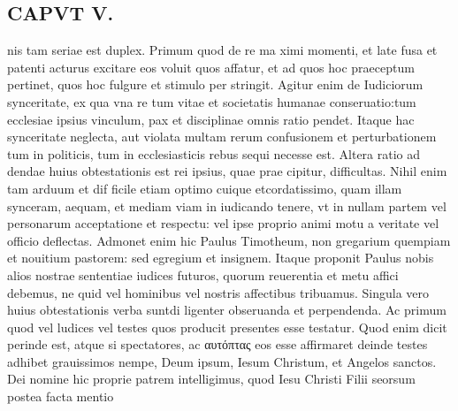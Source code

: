 \documentclass{article}
\begin{document}
\begin{pages}
\section*{CAPVT V. }
\marginpar{[ p.329 ]}\pstart nis tam seriae est duplex. Primum quod de re ma ximi momenti, et late fusa et patenti acturus excitare eos voluit quos affatur, et ad quos hoc praeceptum pertinet, quos hoc fulgure et stimulo per stringit. Agitur enim de Iudiciorum synceritate, ex qua vna re tum vitae et societatis humanae conseruatio:tum ecclesiae ipsius vinculum, pax et disciplinae omnis ratio pendet. Itaque hac synceritate neglecta, aut violata multam rerum confusionem et perturbationem tum in politicis, tum in ecclesiasticis rebus sequi necesse est. Altera ratio ad dendae huius obtestationis est rei ipsius, quae prae cipitur, difficultas. Nihil enim tam arduum et dif ficile etiam optimo cuique etcordatissimo, quam illam synceram, aequam, et mediam viam in iudicando tenere, vt in nullam partem vel personarum acceptatione et respectu: vel ipse proprio animi motu a veritate vel officio deflectas. Admonet enim hic Paulus Timotheum, non gregarium quempiam et nouitium pastorem: sed egregium et insignem. Itaque proponit Paulus nobis alios nostrae sententiae iudices futuros, quorum reuerentia et metu affici debemus, ne quid vel hominibus vel nostris affectibus tribuamus. Singula vero huius obtestationis verba suntdi ligenter obseruanda et perpendenda. Ac primum quod vel ludices vel testes quos producit presentes esse testatur. Quod enim dicit perinde est, atque si spectatores, ac αυτόπτας eos esse affirmaret deinde testes adhibet grauissimos nempe, Deum ipsum, Iesum Christum, et Angelos sanctos. Dei nomine hic proprie patrem intelligimus, quod Iesu Christi Filii seorsum postea facta mentio  \pend

\end{pages}
\end{document}
